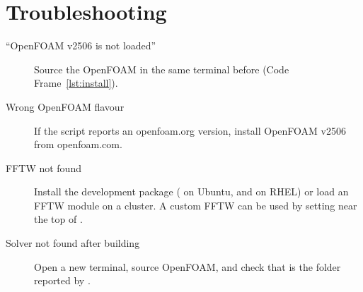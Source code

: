 
\section{Troubleshooting}
\begin{description}
  \item[``OpenFOAM v2506 is not loaded''] Source the OpenFOAM  in the same
    terminal before  (Code Frame~\ref{lst:install}).
  \item[Wrong OpenFOAM flavour] If the script reports an openfoam.org version, install
    OpenFOAM v2506 from openfoam.com.
  \item[FFTW not found] Install the development package ( on Ubuntu,
     and  on RHEL) or load an FFTW module on a cluster. A
    custom FFTW can be used by setting 
    near the top of .
  \item[Solver not found after building] Open a new terminal, source OpenFOAM, and check that
     is the folder reported by .
\end{description}
